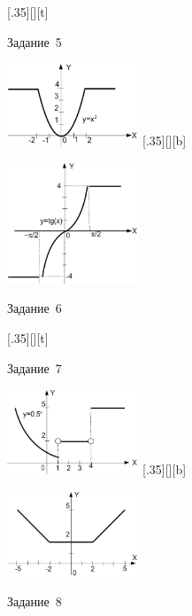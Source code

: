 \begin{figure}[H]
\begin{floatrow}
[.35\textwidth][\FBheight][t]
{\caption{Задание~5}
\label{ch03:refDrawing42}}
{\includegraphics[width=0.35\textwidth,keepaspectratio]{img/ris_3_43}}%
%
[.35\textwidth][\FBheight][b]
{\caption{Задание~6}
\label{ch03:refDrawing43}}
{\includegraphics[width=0.35\textwidth]{img/ris_3_44}}
\end{floatrow}
\end{figure}

\begin{figure}[H]
\begin{floatrow}
[.35\textwidth][\FBheight][t]
{\caption{Задание~7}
\label{ch03:refDrawing44}}
{\includegraphics[width=0.35\textwidth,keepaspectratio]{img/ris_3_45}}%
%
[.35\textwidth][\FBheight][b]
{\caption{Задание~8}
\label{ch03:refDrawing45}}
{\includegraphics[width=0.35\textwidth]{img/ris_3_46}}
\end{floatrow}
\end{figure}

